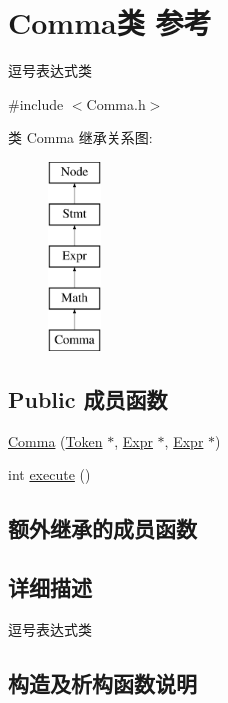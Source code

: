 \hypertarget{class_comma}{}\section{Comma类 参考}
\label{class_comma}


逗号表达式类  




{\ttfamily \#include $<$Comma.\+h$>$}

类 Comma 继承关系图\+:\begin{figure}[H]
\begin{center}
\leavevmode
\includegraphics[height=5.000000cm]{class_comma}
\end{center}
\end{figure}
\subsection*{Public 成员函数}
\begin{DoxyCompactItemize}
\item 
\hyperlink{class_comma_a53c0fef57ecec72be524b054ab6b3ae6}{Comma} (\hyperlink{class_token}{Token} $\ast$, \hyperlink{class_expr}{Expr} $\ast$, \hyperlink{class_expr}{Expr} $\ast$)
\item 
int \hyperlink{class_comma_aab9ca2bb70a10abd2fb263de745f843a}{execute} ()
\end{DoxyCompactItemize}
\subsection*{额外继承的成员函数}


\subsection{详细描述}
逗号表达式类 

\subsection{构造及析构函数说明}
\mbox{\label{class_comma_a53c0fef57ecec72be524b054ab6b3ae6}} 
